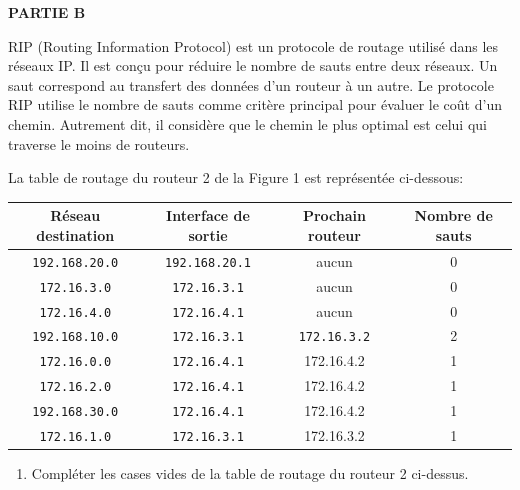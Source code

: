 \documentclass[11pt, a4paper]{report}
\renewcommand{\arraystretch}{1}  %
\begin{document}
\bigskip

\textbf{PARTIE B}

\medskip

RIP (Routing Information Protocol) est un protocole de routage utilisé dans les réseaux IP. Il est conçu pour réduire le nombre de sauts entre deux réseaux. Un \og{}saut\fg{} correspond au transfert des données d'un routeur à un autre. Le protocole RIP utilise le nombre de sauts comme critère principal pour évaluer le coût d'un chemin. Autrement dit, il considère que le chemin le plus optimal est celui qui traverse le moins de routeurs.

\medskip

La table de routage du routeur 2 de la Figure 1 est représentée ci-dessous:

\renewcommand{\arraystretch}{1.5}
\begin{center}
    \begin{tabular}{|c|c|c|c|}
        \hline
        \textbf{Réseau destination} & \textbf{Interface de sortie} & \textbf{Prochain routeur} & \textbf{Nombre de sauts}\\
         

        \hline
        \verb|192.168.20.0| & \verb|192.168.20.1| & aucun & 0 \\ \hline
        \verb|172.16.3.0| & \verb|172.16.3.1| & aucun & 0 \\ \hline
        \verb|172.16.4.0| & \verb|172.16.4.1| & aucun & 0 \\ \hline
        \verb|192.168.10.0| & \verb|172.16.3.1| & \verb|172.16.3.2| & 2 \\ \hline
        \verb|172.16.0.0| & \verb|172.16.4.1|  & 172.16.4.2 & 1 \\ \hline
        \verb|172.16.2.0| & \verb|172.16.4.1| & 172.16.4.2 & 1 \\ \hline
        \verb|192.168.30.0| & \verb|172.16.4.1| & 172.16.4.2 & 1 \\ \hline
        \verb|172.16.1.0| & \verb|172.16.3.1| & 172.16.3.2 & 1 \\ \hline
    \end{tabular}
\end{center}

\begin{enumerate}[resume]
    \item Compléter les cases vides de la table de routage du routeur 2 ci-dessus.
\end{enumerate}

\medskip
\end{document}
